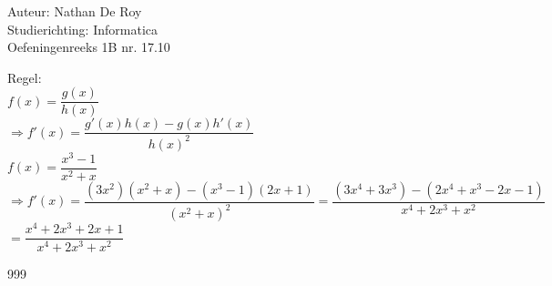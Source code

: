 \documentclass[a4paper]{article}
\begin{document}
  
\noindent \large Auteur: Nathan De Roy \\
\noindent \large Studierichting: Informatica\\
\noindent \large Oefeningenreeks 1B nr. 17.10\\

\medskip

\normalsize

Regel:\\

$f(x) = \dfrac{g(x)}{h(x)}$\\

$\Rightarrow f'(x) = \dfrac{g'(x)h(x) - g(x)h'(x)}{h(x)^2}$\\


$f(x) = \dfrac{x^3 - 1}{x^2 + x}$\\

$\Rightarrow f'(x) = \dfrac{(3x^2)(x^2 + x) - (x^3 - 1)(2x + 1)}{(x^2 + x)^2} = \dfrac{(3x^4 + 3x^3) - (2x^4+ x^3 - 2x - 1)}{x^4 + 2x^3 + x^2}$\\

$ = \dfrac{x^4 + 2x^3 + 2x + 1}{x^4 + 2x^3 + x^2}$\\

\begin{thebibliography}{999}
\end{thebibliography}
\end{document}

